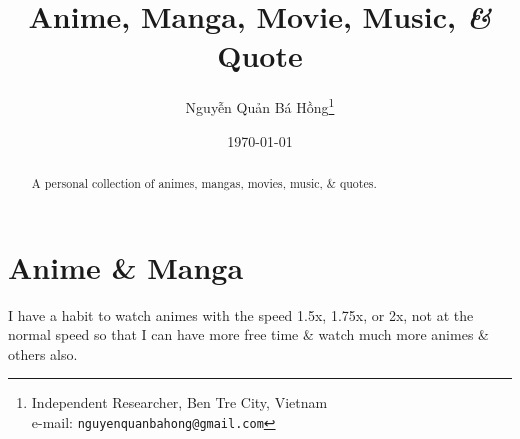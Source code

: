 \documentclass{article}
\title{Anime, Manga, Movie, Music, \textit{\&} Quote}
\author{Nguyễn Quản Bá Hồng\footnote{Independent Researcher, Ben Tre City, Vietnam\\e-mail: \texttt{nguyenquanbahong@gmail.com}}}
\date{\today}
\begin{document}
\maketitle
\begin{abstract}
	A personal collection of animes, mangas, movies, music, \& quotes.
\end{abstract}
\tableofcontents
\newpage


\section{Anime \& Manga}
I have a habit to watch animes with the speed 1.5x, 1.75x, or 2x, not at the normal speed so that I can have more free time \& watch much more animes \& others also.
\end{document}
